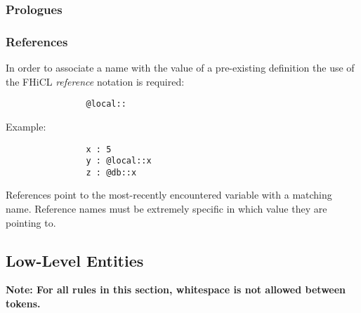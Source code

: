 \documentclass{article}
\begin{document}
		\subsubsection{Prologues}
			
		\subsubsection{References}
			In order to associate a name
			with the value of a pre-existing definition 
			the use of the FHiCL \emph{reference} notation is required:
			\begin{verbatim}
				@local::
			\end{verbatim}
			Example:
			\begin{verbatim}
				x : 5
				y : @local::x
				z : @db::x
			\end{verbatim}
			\par
			References point to the most-recently encountered variable
			with a matching name.
			Reference names must be extremely specific
			in which value they are pointing to.
			
	\subsection{Low-Level Entities}
		\bf Note: \rm For all rules in this section,
		whitespace is not allowed between tokens.
\end{document}
